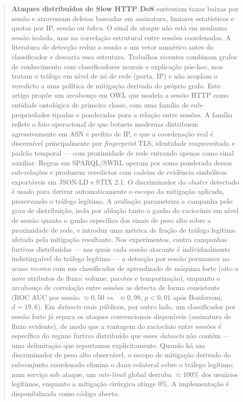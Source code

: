 \documentclass[preprint,12pt]{elsarticle}
\begin{document}
\begin{frontmatter}
\begin{abstract}
\textbf{Ataques distribuídos de Slow HTTP DoS} sustentam taxas baixas por sessão e atravessam defesas baseadas em assinatura, limiares estatísticos e quotas por IP, sessão ou \emph{token}. O sinal de ataque não está em nenhuma sessão isolada, mas na correlação estrutural entre sessões coordenadas. A literatura de detecção reduz a sessão a um vetor numérico antes do classificador e descarta essa estrutura. Trabalhos recentes combinam grafos de conhecimento com classificadores neurais e explicação pós-hoc, mas tratam o tráfego em nível de nó de rede (porta, IP) e não acoplam o veredicto a uma política de mitigação derivada do próprio grafo. Este artigo propõe um arcabouço em OWL que modela a sessão HTTP como entidade ontológica de primeira classe, com uma família de sub-propriedades tipadas e ponderadas para a relação entre sessões. A família reflete o fato operacional de que botnets modernas distribuem agressivamente em ASN e prefixo de IP, e que a coordenação real é discernível principalmente por \emph{fingerprint} TLS, identidade reaproveitada e padrão temporal --- com proximidade de rede entrando apenas como sinal auxiliar. Regras em SPARQL/SWRL operam por soma ponderada dessas sub-relações e produzem veredictos com cadeias de evidência simbólicas exportáveis em JSON-LD e STIX 2.1. O discriminador do \emph{cluster} detectado é usado para derivar automaticamente o escopo da mitigação aplicada, preservando o tráfego legítimo. A avaliação parametriza a campanha pelo grau de distribuição, isola por ablação tanto o ganho do raciocínio em nível de sessão quanto o ganho específico dos sinais de peso alto sobre a proximidade de rede, e introduz uma métrica de fração de tráfego legítimo afetada pela mitigação resultante. Nos experimentos, contra campanhas furtivas distribuídas --- nas quais cada sessão atacante é individualmente indistinguível do tráfego legítimo --- a detecção por sessão permanece no acaso \emph{mesmo} com um classificador de aprendizado de máquina forte (oito a nove atributos de fluxo: volume, pacotes e temporização), enquanto o arcabouço de correlação entre sessões as detecta de forma consistente (ROC AUC por sessão $\approx 0{,}50$ \emph{vs.}\ $\approx 0{,}98$; $p < 0{,}01$ após Bonferroni, $d = 19{,}6$). Em \emph{datasets} reais públicos, por outro lado, um classificador por sessão forte já separa os ataques convencionais disponíveis (assinatura de fluxo evidente), de modo que a vantagem do raciocínio entre sessões é específica do regime furtivo distribuído que esses \emph{datasets} não contêm --- uma delimitação que reportamos explicitamente. Quando há um discriminador de peso alto observável, o escopo de mitigação derivado do subconjunto coordenado elimina o dano colateral sobre o tráfego legítimo: num serviço sob ataque, um \emph{rate-limit} global derruba $\approx 100\%$ dos usuários legítimos, enquanto a mitigação cirúrgica atinge $0\%$. A implementação é disponibilizada como código aberto.


\end{abstract}
\end{frontmatter}
\end{document}
